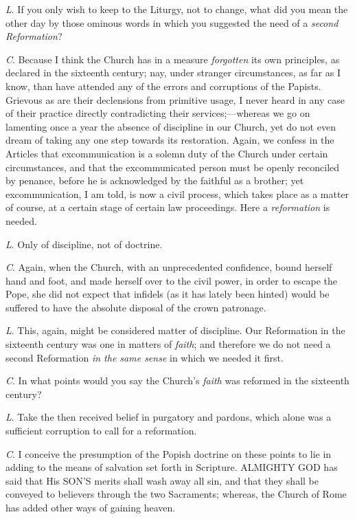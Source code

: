 \emph{L}. If you only wish to keep to the
Liturgy, not to change, what did you mean the other day by those
ominous words in which you suggested the need of a \emph{second
Reformation}?

\emph{C}. Because I think the Church has in a
measure \emph{forgotten} its own principles, as declared in the
sixteenth century; nay, under stranger circumstances, as far as I
know, than have attended any of the errors and corruptions of the
Papists. Grievous as are their declensions from primitive usage, I
never heard in any case of their practice directly contradicting their
services;—whereas we go on lamenting once a year the absence of
discipline in our Church, yet do not even dream of taking any one step
towards its restoration. Again, we confess in the Articles that
excommunication is a solemn duty of the Church under certain
circumstances, and that the excommunicated person must be openly
reconciled by penance, before he is acknowledged by the faithful as a
brother; yet excommunication, I am told, is now a civil process, which
takes place as a matter of course, at a certain stage of certain law
proceedings. Here a \emph{reformation} is needed.

\emph{L}. Only of discipline, not of doctrine.

\emph{C}. Again, when the Church, with an
unprecedented confidence, bound herself hand and foot, and made
herself over to the civil power, in order to escape the Pope, she did
not expect that infidels (as it has lately been hinted) would be
suffered to have the absolute disposal of the crown patronage.

\emph{L}. This, again, might be considered matter
of discipline. Our Reformation in the sixteenth century was one in
matters of \emph{faith}; and therefore we do not need a second
Reformation \emph{in the same sense} in which we needed it first.

\emph{C}. In what points would you say the Church's
\emph{faith} was reformed in the sixteenth century?

\emph{L}. Take the then received belief in
purgatory and pardons, which alone was a sufficient corruption to call
for a reformation.

\emph{C}. I conceive the presumption of the
Popish doctrine on these points to lie in adding to the means of
salvation set forth in Scripture. ALMIGHTY
GOD has said that His SON'S merits shall wash away all sin, and that they shall be
conveyed to believers through the two Sacraments; whereas, the Church
of Rome has added other ways of gaining heaven.

